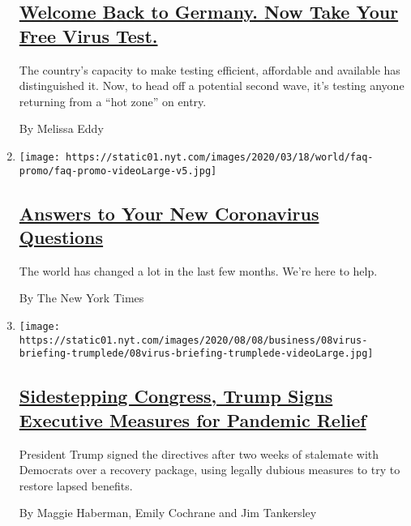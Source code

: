 \begin{enumerate}
  \hypertarget{welcome-back-to-germany-now-take-your-free-virus-test}{%
  \subsection{\texorpdfstring{\href{/2020/08/05/world/europe/germany-coronavirus-test-travelers.html}{Welcome
  Back to Germany. Now Take Your Free Virus
  Test.}}{Welcome Back to Germany. Now Take Your Free Virus Test.}}\label{welcome-back-to-germany-now-take-your-free-virus-test}}

  The country's capacity to make testing efficient, affordable and
  available has distinguished it. Now, to head off a potential second
  wave, it's testing anyone returning from a ``hot zone'' on entry.

  By Melissa Eddy
\item
  \texttt{[image: https://static01.nyt.com/images/2020/03/18/world/faq-promo/faq-promo-videoLarge-v5.jpg]}

  \hypertarget{answers-to-your-new-coronavirus-questions}{%
  \subsection{\texorpdfstring{\href{/interactive/2020/world/coronavirus-tips-advice.html}{Answers
  to Your New Coronavirus
  Questions}}{Answers to Your New Coronavirus Questions}}\label{answers-to-your-new-coronavirus-questions}}

  The world has changed a lot in the last few months. We're here to
  help.

  By The New York Times
\item
  \texttt{[image: https://static01.nyt.com/images/2020/08/08/business/08virus-briefing-trumplede/08virus-briefing-trumplede-videoLarge.jpg]}

  \hypertarget{sidestepping-congress-trump-signs-executive-measures-for-pandemic-relief}{%
  \subsection{\texorpdfstring{\href{/2020/08/08/us/politics/trump-stimulus-bill-coronavirus.html}{Sidestepping
  Congress, Trump Signs Executive Measures for Pandemic
  Relief}}{Sidestepping Congress, Trump Signs Executive Measures for Pandemic Relief}}\label{sidestepping-congress-trump-signs-executive-measures-for-pandemic-relief}}

  President Trump signed the directives after two weeks of stalemate
  with Democrats over a recovery package, using legally dubious measures
  to try to restore lapsed benefits.

  By Maggie Haberman, Emily Cochrane and Jim Tankersley
\end{enumerate}

